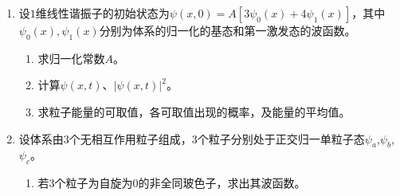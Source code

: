 
\begin{enumerate}
	\item
设$ 1 $维线性谐振子的初始状态为\(\psi(x, 0)=A\left[3 \psi_{0}(x)+4 \psi_{1}(x)\right]\)，其中
	\(\psi_{0}(x), \psi_{1}(x)\)分别为体系的归一化的基态和第一激发态的波函数。
	\begin{enumerate}
		\item
求归一化常数$ A $。
	
	\item 
	计算\(\psi(x, t)\)、\(|\psi(x, t)|^{2}\)。
	
	\item 
	求粒子能量的可取值，各可取值出现的概率，及能量的平均值。
		\end{enumerate}



\item 
设体系由$ 3 $个无相互作用粒子组成，$ 3 $个粒子分别处于正交归一单粒子态\(\psi_a\),\(\psi_b\),\(\psi_c\)。
\begin{enumerate}
	\item
若$ 3 $个粒子为自旋为$ 0 $的非全同玻色子，求出其波函数。
	

\end{enumerate}
\end{enumerate}
